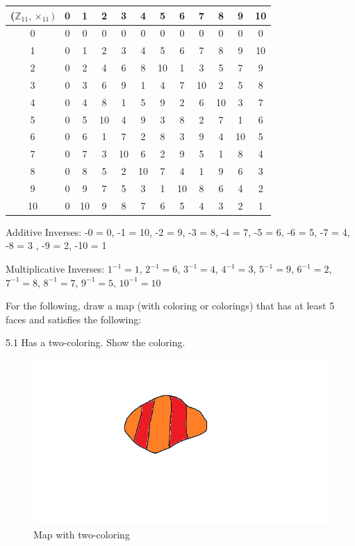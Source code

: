 \documentclass{article}
\begin{document}
\item[]\begin{center}
 \begin{tabular}{||c c c c c c c c c c c c ||} 
 \hline
 ($\mathbb{Z}_{11}, \times_{11})$ & 0 & 1 & 2 & 3 & 4 & 5 & 6 & 7 & 8  & 9 & 10 \\ [0.5ex] 
 \hline\hline
 0 & 0 & 0 & 0 & 0 & 0 & 0 & 0 & 0 & 0  & 0 & 0 \\
 \hline
 1 & 0 & 1 & 2 & 3 & 4 & 5 & 6 & 7 & 8 & 9 & 10 \\ 
 \hline
 2 & 0 & 2 & 4 & 6 & 8 & 10 & 1 & 3 & 5 & 7 & 9 \\
 \hline
 3 & 0 & 3 & 6 & 9 & 1 & 4 & 7 & 10 & 2 & 5 & 8 \\
 \hline
 4 & 0 & 4 & 8 & 1 & 5 & 9 & 2 & 6 & 10 & 3 & 7 \\
 \hline
 5 & 0 & 5 & 10 & 4 & 9 & 3 & 8 & 2 & 7 & 1 & 6 \\ 
 \hline
 6 & 0 & 6 & 1 & 7 & 2 & 8 & 3 & 9 & 4 & 10 & 5 \\
 \hline
 7 & 0 & 7 & 3 & 10 & 6 & 2 & 9 & 5 & 1 & 8 & 4 \\
 \hline
 8 & 0 & 8 & 5 & 2 & 10 & 7 & 4 & 1 & 9 & 6 & 3 \\ 
 \hline 
 9 & 0 & 9 & 7 & 5 & 3 & 1 & 10 & 8 & 6 & 4 & 2 \\
 \hline 
 10 & 0 & 10 & 9 & 8 & 7 & 6 & 5 & 4 & 3 & 2 & 1 \\
 \hline
\end{tabular}
\end{center}

\item[] Additive Inverses:  -0 = 0, -1 = 10, -2 = 9, -3 = 8, -4 = 7, -5 = 6, -6 = 5, -7 = 4, -8 = 3 , -9 = 2, -10 = 1
\item[] Multiplicative Inverses: $1^{-1} = 1$, $2^{-1} = 6$, $3^{-1} = 4$, $4^{-1} = 3$, $5^{-1} = 9$, $6^{-1} = 2$, $7 ^{-1} = 8$, $8^{-1} = 7$, $9^{-1} = 5$, $10^{-1} = 10$


\clearpage
\header
For the following, draw a map (with coloring or colorings) that has at least 5 faces and satisfies the following:
\item[]5.1 Has a two-coloring. Show the coloring.
\begin{figure}[h!]
  \includegraphics[width=\linewidth]{Untitled.png}
  \caption{Map with two-coloring}
  \label{fig:map1}
\end{figure}
\end{document}
